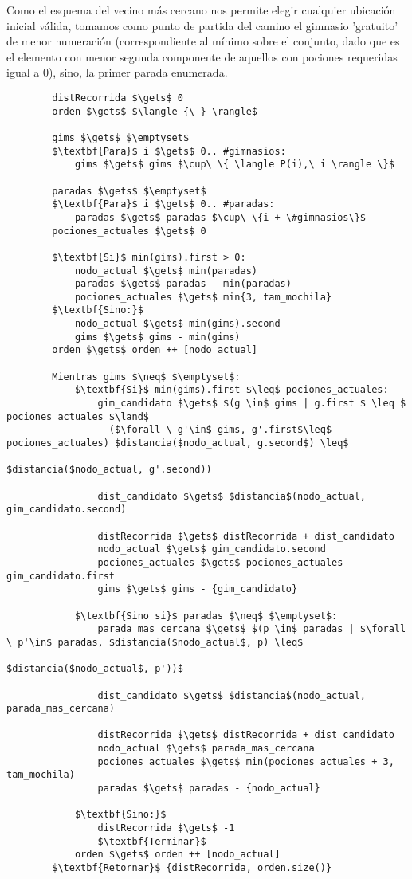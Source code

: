     Como el esquema del vecino más cercano nos permite elegir cualquier ubicación inicial válida, tomamos como punto de partida del camino el gimnasio 'gratuito' de menor numeración (correspondiente al mínimo sobre el conjunto, dado que es el elemento con menor segunda componente de aquellos con pociones requeridas igual a 0), sino, la primer parada enumerada.
        \begin{lstlisting}
        distRecorrida $\gets$ 0
        orden $\gets$ $\langle {\ } \rangle$

        gims $\gets$ $\emptyset$
        $\textbf{Para}$ i $\gets$ 0.. #gimnasios:
            gims $\gets$ gims $\cup\ \{ \langle P(i),\ i \rangle \}$

        paradas $\gets$ $\emptyset$
        $\textbf{Para}$ i $\gets$ 0.. #paradas:
            paradas $\gets$ paradas $\cup\ \{i + \#gimnasios\}$
        pociones_actuales $\gets$ 0

        $\textbf{Si}$ min(gims).first > 0:
            nodo_actual $\gets$ min(paradas)
            paradas $\gets$ paradas - min(paradas)
            pociones_actuales $\gets$ min{3, tam_mochila}
        $\textbf{Sino:}$
            nodo_actual $\gets$ min(gims).second
            gims $\gets$ gims - min(gims)
        orden $\gets$ orden ++ [nodo_actual]

        Mientras gims $\neq$ $\emptyset$:
            $\textbf{Si}$ min(gims).first $\leq$ pociones_actuales:
                gim_candidato $\gets$ $(g \in$ gims | g.first $ \leq $ pociones_actuales $\land$
                  ($\forall \ g'\in$ gims, g'.first$\leq$ pociones_actuales) $distancia($nodo_actual, g.second$) \leq$
                                                            $distancia($nodo_actual, g'.second))

                dist_candidato $\gets$ $distancia$(nodo_actual, gim_candidato.second)

                distRecorrida $\gets$ distRecorrida + dist_candidato
                nodo_actual $\gets$ gim_candidato.second
                pociones_actuales $\gets$ pociones_actuales - gim_candidato.first
                gims $\gets$ gims - {gim_candidato}

            $\textbf{Sino si}$ paradas $\neq$ $\emptyset$:
                parada_mas_cercana $\gets$ $(p \in$ paradas | $\forall \ p'\in$ paradas, $distancia($nodo_actual$, p) \leq$
                                                                 $distancia($nodo_actual$, p'))$

                dist_candidato $\gets$ $distancia$(nodo_actual, parada_mas_cercana)

                distRecorrida $\gets$ distRecorrida + dist_candidato
                nodo_actual $\gets$ parada_mas_cercana
                pociones_actuales $\gets$ min(pociones_actuales + 3, tam_mochila)
                paradas $\gets$ paradas - {nodo_actual}

            $\textbf{Sino:}$
                distRecorrida $\gets$ -1
                $\textbf{Terminar}$
            orden $\gets$ orden ++ [nodo_actual]
        $\textbf{Retornar}$ {distRecorrida, orden.size()}
        \end{lstlisting}


